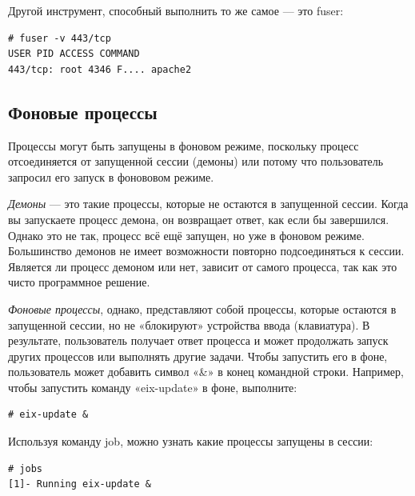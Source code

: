\documentclass[10pt]{book}
\begin{document}
Другой инструмент, способный выполнить то же самое — это fuser:

\vspace{3mm}
\begin{tcolorbox}
\begin{lstlisting}
# fuser -v 443/tcp
USER PID ACCESS COMMAND
443/tcp: root 4346 F.... apache2
\end{lstlisting}
\end{tcolorbox}

\subsection{Фоновые процессы}
Процессы могут быть запущены в фоновом режиме, поскольку процесс отсоединяется от запущенной сессии (демоны) или потому что пользователь запросил его запуск в фонововом режиме. 

\textit{Демоны} — это такие процессы, которые не остаются в запущенной сессии. Когда вы запускаете процесс демона, он возвращает ответ, как если бы  завершился. Однако это не так, процесс всё ещё запущен, но уже в фоновом режиме. Большинство демонов не имеет возможности повторно подсоединяться к сессии. Является ли процесс демоном или нет, зависит от самого процесса, так как это чисто программное решение.

\textit{Фоновые процессы}, однако, представляют собой процессы, которые остаются в запущенной сессии, но не «блокируют» устройства ввода (клавиатура). В результате, пользователь получает ответ процесса и может продолжать запуск других процессов или выполнять другие задачи. Чтобы запустить его в фоне, пользователь может добавить символ «\&» в конец командной строки. Например, чтобы запустить команду «eix-update» в фоне, выполните:

\vspace{3mm}
\begin{tcolorbox}
\begin{lstlisting}
# eix-update &
\end{lstlisting}
\end{tcolorbox}

Используя команду job, можно узнать какие процессы запущены в сессии:

\vspace{3mm}
\begin{tcolorbox}
\begin{lstlisting}
# jobs
[1]- Running eix-update &
\end{lstlisting}
\end{tcolorbox}
\end{document}
